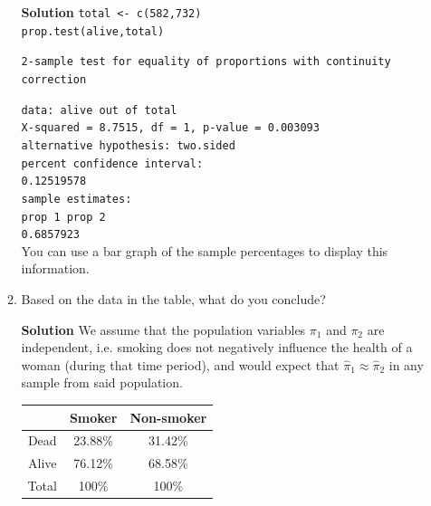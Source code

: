 \begin{enumerate}
\begin{enumerate}
\begin{framed}{\textbf{Solution}}
        \texttt{total <- c(582,732)} \\
        \texttt{prop.test(alive,total)} 
        \begin{center}
            \texttt{2-sample test for equality of proportions with continuity correction} 
        \end{center}
        \texttt{\quad data:  alive out of total \\
        \quad X-squared = 8.7515, df = 1, p-value = 0.003093 \\
        \quad alternative hypothesis: two.sided \\
         percent confidence interval: \\
         0.12519578 \\
        \quad sample estimates: \\
        \quad    prop 1    prop 2  \\
         0.6857923} \\
        You can use a bar graph of the sample percentages to display this information. 
        \end{framed}
        
        
        \item Based on the data in the table, what do you conclude?
        \begin{framed}{\textbf{Solution}}
        We assume that the population variables $\pi_1$ and $\pi_2$ are independent, i.e. smoking does not negatively influence the health of a woman (during that time period), and would expect that $\hat{\pi}_1 \approx \hat{\pi}_2$ in any sample from said population. 
        \end{framed}
        
    \FloatBarrier
    \begin{table}[h]
        \centering
        \begin{tabular}{c|cc}
             {} & Smoker & Non-smoker \\ \hline
             Dead & 23.88\% & 31.42\% \\
             Alive & 76.12\% & 68.58\% \\ \hline 
             Total & 100\% & 100\%
        \end{tabular}
    \end{table}
    \FloatBarrier
    \end{enumerate}
    

\end{enumerate}
